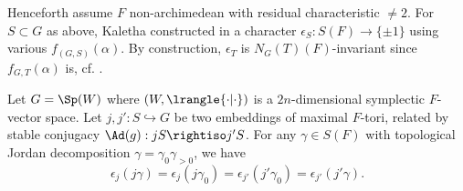 \documentclass[a4paper,10pt]{article}
\begin{document}
Henceforth assume $F$ non-archimedean with residual characteristic $\neq 2$. For $S \subset G$ as above, Kaletha constructed in \cite[\S 4.6]{Kal15} a character $\epsilon_S: S(F) \to \{\pm 1\}$ using various $f_{(G,S)}(\alpha)$. By construction, $\epsilon_T$ is $N_G(T)(F)$-invariant since $f_{G,T}(\alpha)$ is, cf. \cite[Fact 4.7.4]{Kal16}. 
\begin{lemma}\label{prop:epsilon-invariance}
	Let $G=\Sp(W)$ where $(W, \lrangle{\cdot|\cdot})$ is a $2n$-dimensional symplectic $F$-vector space. Let $j,j': S \hookrightarrow G$ be two embeddings of maximal $F$-tori, related by stable conjugacy $\Ad(g): jS \rightiso j'S$. For any $\gamma \in S(F)$ with topological Jordan decomposition $\gamma = \gamma_0 \gamma_{>0}$, we have
	\[ \epsilon_j(j\gamma) = \epsilon_j(j\gamma_0) = \epsilon_{j'}(j'\gamma_0) = \epsilon_{j'}(j'\gamma). \]
\end{lemma}
\end{document}
